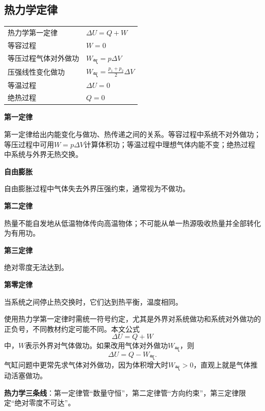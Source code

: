 
\subsection{热力学定律}
\begin{tabularx}{\columnwidth}{XX}
  热力学第一定律    & $\Delta U=Q+W$                           \\
  等容过程       & $W=0$                                    \\
  等压过程气体对外做功 & $W_{\text{气}}=p\Delta V$                 \\
  压强线性变化做功   & $W_{\text{气}}=\frac{p_1+p_2}{2}\Delta V$ \\
  等温过程       & $\Delta U=0$                             \\
  绝热过程       & $Q=0$                                    \\
\end{tabularx}

\textbf{第一定律}

第一定律给出内能变化与做功、热传递之间的关系。等容过程中系统不对外做功；等压过程中可用$W=p\Delta V$计算体积功；等温过程中理想气体内能不变；绝热过程中系统与外界无热交换。

\textbf{自由膨胀}

自由膨胀过程中气体失去外界压强约束，通常视为不做功。

\textbf{第二定律}

热量不能自发地从低温物体传向高温物体；不可能从单一热源吸收热量并全部转化为有用功。

\textbf{第三定律}

绝对零度无法达到。

\textbf{第零定律}

当系统之间停止热交换时，它们达到热平衡，温度相同。

\begin{formulanotebox}
  使用热力学第一定律时需统一符号约定，尤其是外界对系统做功和系统对外做功的正负号，不同教材约定可能不同。本文公式
  \[
    \Delta U=Q+W
  \]
  中，$W$表示外界对气体做功。如果改用气体对外做功$W_{\text{气}}$，则
  \[
    \Delta U=Q-W_{\text{气}}.
  \]
  气缸问题中更常先求气体对外做功，因为体积增大时$W_{\text{气}}>0$，直观上就是气体推动活塞做功。
\end{formulanotebox}

\begin{keypointbox}
  \textbf{热力学三条线}：第一定律管“数量守恒”，第二定律管“方向约束”，第三定律限定“绝对零度不可达”。
\end{keypointbox}

